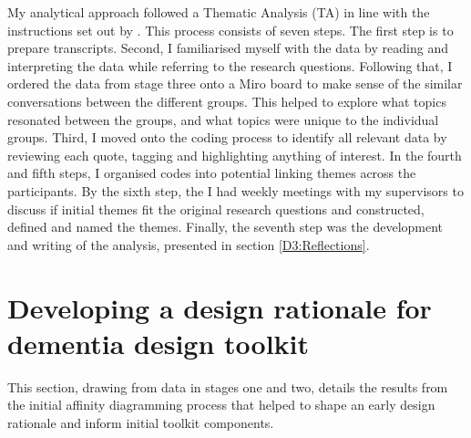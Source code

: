 My analytical approach followed a Thematic Analysis (TA) in line with the instructions set out by  \cite{braun_using_2006,braun_one_2020}. This process consists of seven steps. The first step is to prepare transcripts. Second,  I familiarised myself with the data by reading and interpreting the data while referring to the research questions. Following that, I ordered the data from stage three onto a Miro board to make sense of the similar conversations between the different groups. This helped to explore what topics resonated between the groups, and what topics were unique to the individual groups. Third, I moved onto the coding process to identify all relevant data by reviewing each quote, tagging and highlighting anything of interest. In the fourth and fifth steps, I organised codes into potential linking themes across the participants. By the sixth step, the I had weekly meetings with my supervisors to discuss if initial themes fit the original research questions and constructed, defined and named the themes. Finally, the seventh step was the development and writing of the analysis, presented in section \ref{D3:Reflections}.

\section{Developing a design rationale for dementia design toolkit}
\label{D3:Rationale}
This section, drawing from data in stages one and two, details the results from the initial affinity diagramming process that helped to shape an early design rationale and inform initial toolkit components.

